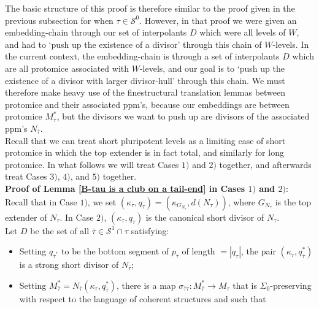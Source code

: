 \documentclass[12pt]{article}
\begin{document}
The basic structure of this proof is therefore similar to the proof given in the previous subsection for when $\tau \in \mathcal{S}^0$.  However, in that proof we were given an embedding-chain through our set of interpolants $D$ which were all levels of $W$, and had to `push up the existence of a divisor' through this chain of $W$-levels.  In the current context, the embedding-chain is through a set of interpolants $D$ which are all protomice associated with $W$-levels, and our goal is to `push up the existence of a divisor with larger divisor-hull' through this chain.  We must therefore make heavy use of the finestructural translation lemmas between protomice and their associated ppm's, because our embeddings are between protomice $M^*_{\bar{\tau}}$, but the divisors we want to push up are divisors of the associated ppm's $N_{\bar{\tau}}$.\\

Recall that we can treat short pluripotent levels as a limiting case of short protomice in which the top extender is in fact total, and similarly for long protomice.  In what follows we will treat Cases $1)$ and $2)$ together, and afterwards treat Cases $3)$, $4)$, and $5)$ together.\\





\textbf{Proof of Lemma \ref{B-tau is a club on a tail-end} in Cases $1)$ and $2)$}:\\







Recall that in Case $1)$, we set $(\kappa_\tau , q_\tau ) = (\kappa_{G_{N_\tau}} , d(N_\tau ) )$, where $G_{N_\tau}$ is the top extender of $N_\tau$.  In Case $2)$, $(\kappa_\tau , q_\tau )$ is the canonical short divisor of $N_\tau$.\\

Let $D$ be the set of all $\bar{\tau} \in \mathcal{S}^1 \cap \tau$ satisfying:


\begin{itemize}
\item{Setting $q_{\bar{\tau}^*}$ to be the bottom segment of $p_{\bar{\tau}}$ of length $= | q_\tau |$, the pair $(\kappa_\tau , q_{\bar{\tau}}^*)$ is a strong short divisor of $N_{\bar{\tau}}$;}
\item{Setting $M_{\bar{\tau}}^* = N_{\bar{\tau}} (\kappa_\tau , q_{\bar{\tau}}^*)$, there is a map $\sigma_{\bar{\tau} \tau } : M_{\bar{\tau}}^* \longrightarrow M_\tau$ that is $\Sigma_0$-preserving with respect to the language of coherent structures and such that}
\end{itemize}
\end{document}

